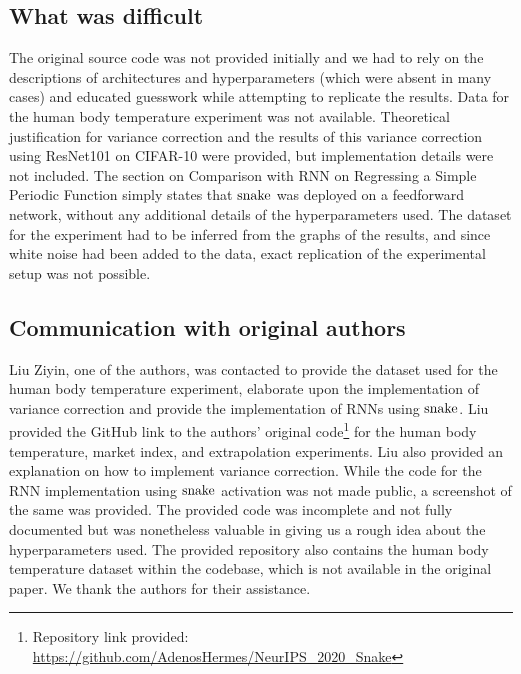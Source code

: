 \subsection{What was difficult}

The original source code was not provided initially and we had to rely on the descriptions of architectures and hyperparameters (which were absent in many cases) and educated guesswork while attempting to replicate the results.
Data for the human body temperature experiment was not available.
Theoretical justification for variance correction and the results of this variance correction using ResNet101 on CIFAR-10 were provided, but implementation details were not included.
The section on Comparison with RNN on Regressing a Simple Periodic Function simply states that $ \operatorname{snake} $ was deployed on a feedforward network, without any additional details of the hyperparameters used. The dataset for the experiment had to be inferred from the graphs of the results, and since white noise had been added to the data, exact replication of the experimental setup was not possible.

\subsection{Communication with original authors}

Liu Ziyin, one of the authors, was contacted to provide the dataset used for the human body temperature experiment, elaborate upon the implementation of variance correction and provide the implementation of RNNs using $ \operatorname{snake} $. Liu provided the GitHub link to the authors' original code\footnote{Repository link provided: \url{https://github.com/AdenosHermes/NeurIPS_2020_Snake}} for the human body temperature, market index, and extrapolation experiments. Liu also provided an explanation on how to implement variance correction. While the code for the RNN implementation using $ \operatorname{snake} $ activation was not made public, a screenshot of the same was provided. The provided code was incomplete and not fully documented but was nonetheless valuable in giving us a rough idea about the hyperparameters used. The provided repository also contains the human body temperature dataset within the codebase, which is not available in the original paper. We thank the authors for their assistance.
